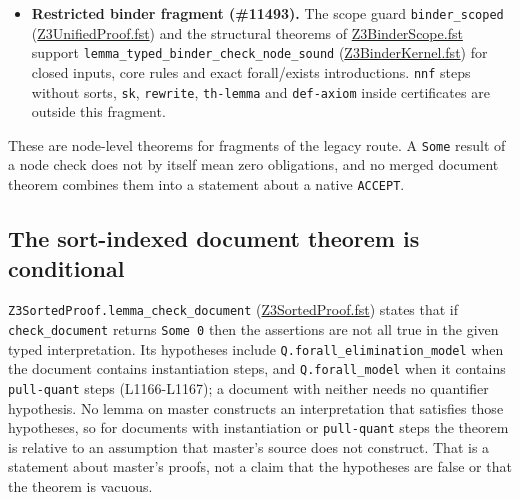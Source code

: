 \documentclass[10pt,a4paper]{article}
\begin{document}
\begin{itemize}
\item \textbf{Restricted binder fragment (\#11493).} The scope guard \texttt{binder\_\allowbreak{}scoped} (\href{https://github.com/Z3Prover/z3/blob/8fbb275aba0472e862e289c7af1331b3bd5d512c/fstar/Z3UnifiedProof.fst\#L987-L999}{Z3Unified\allowbreak{}Proof.\allowbreak{}fst}) and the structural theorems of \href{https://github.com/Z3Prover/z3/blob/8fbb275aba0472e862e289c7af1331b3bd5d512c/fstar/Z3BinderScope.fst}{Z3Binder\allowbreak{}Scope.\allowbreak{}fst} support \texttt{lemma\_\allowbreak{}typed\_\allowbreak{}binder\_\allowbreak{}check\_\allowbreak{}node\_\allowbreak{}sound} (\href{https://github.com/Z3Prover/z3/blob/8fbb275aba0472e862e289c7af1331b3bd5d512c/fstar/Z3BinderKernel.fst\#L543-L554}{Z3Binder\allowbreak{}Kernel.\allowbreak{}fst}) for closed inputs, core rules and exact forall/exists introductions. \texttt{nnf} steps without sorts, \texttt{sk}, \texttt{rewrite}, \texttt{th-{}\allowbreak{}lemma} and \texttt{def-{}\allowbreak{}axiom} inside certificates are outside this fragment.

\end{itemize}

These are node-level theorems for fragments of the legacy route. A \texttt{Some} result of a node check does not by itself mean zero obligations, and no merged document theorem combines them into a statement about a native \texttt{ACCEPT}.

\subsection{The sort-indexed document theorem is conditional}\label{sec:53-the-sort-indexed-document-theorem-is-conditional}

\texttt{Z3SortedProof.\allowbreak{}lemma\_\allowbreak{}check\_\allowbreak{}document} (\href{https://github.com/Z3Prover/z3/blob/8fbb275aba0472e862e289c7af1331b3bd5d512c/fstar/Z3SortedProof.fst\#L1162-L1178}{Z3Sorted\allowbreak{}Proof.\allowbreak{}fst}) states that if \texttt{check\_\allowbreak{}document} returns \texttt{Some 0} then the assertions are not all true in the given typed interpretation. Its hypotheses include \texttt{Q.\allowbreak{}forall\_\allowbreak{}elimination\_\allowbreak{}model} when the document contains instantiation steps, and \texttt{Q.\allowbreak{}forall\_\allowbreak{}model} when it contains \texttt{pull-{}\allowbreak{}quant} steps (L1166-L1167); a document with neither needs no quantifier hypothesis. No lemma on master constructs an interpretation that satisfies those hypotheses, so for documents with instantiation or \texttt{pull-{}\allowbreak{}quant} steps the theorem is relative to an assumption that master's source does not construct. That is a statement about master's proofs, not a claim that the hypotheses are false or that the theorem is vacuous.
\end{document}
